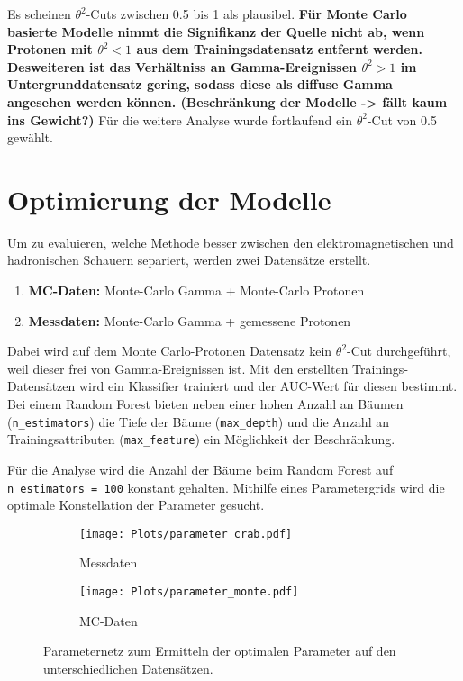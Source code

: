 Es scheinen $\theta^{2}$-Cuts zwischen \num{0.5} bis \num{1} als plausibel. 
\textbf{Für Monte Carlo basierte Modelle nimmt die Signifikanz der Quelle nicht ab, wenn Protonen mit $\theta^{2} < 1$ aus dem Trainingsdatensatz entfernt werden. 
Desweiteren ist das Verhältniss an Gamma-Ereignissen $\theta^{2} > 1$ im Untergrunddatensatz gering, sodass diese als diffuse Gamma angesehen werden können. (Beschränkung der Modelle -> fällt kaum ins Gewicht?)} 
Für die weitere Analyse wurde fortlaufend ein $\theta^{2}$-Cut von \num{0.5} gewählt. 
\section{Optimierung der Modelle}
Um zu evaluieren, welche Methode besser zwischen den elektromagnetischen und hadronischen Schauern separiert, werden zwei Datensätze erstellt. 
\begin{enumerate}
  \item \textbf{MC-Daten:} Monte-Carlo Gamma + Monte-Carlo Protonen
  \item \textbf{Messdaten:} Monte-Carlo Gamma + gemessene Protonen 
\end{enumerate}
Dabei wird auf dem Monte Carlo-Protonen Datensatz kein $\theta^{2}$-Cut durchgeführt, weil dieser frei von Gamma-Ereignissen ist.
Mit den erstellten Trainings-Datensätzen wird ein Klassifier trainiert und der AUC-Wert für diesen bestimmt.
Bei einem Random Forest bieten neben einer hohen Anzahl an Bäumen (\texttt{n\_estimators}) die Tiefe der Bäume (\texttt{max\_depth}) und die Anzahl an Trainingsattributen (\texttt{max\_feature}) ein Möglichkeit der Beschränkung.

Für die Analyse wird die Anzahl der Bäume beim Random Forest auf \texttt{n\_estimators = 100} konstant gehalten. 
Mithilfe eines Parametergrids wird die optimale Konstellation der Parameter gesucht. 
\begin{figure}
  \begin{subfigure}[b]{0.5\textwidth}
	\texttt{[image: Plots/parameter\_crab.pdf]}
	\caption{Messdaten}
	\label{fig:messGrid}
  \end{subfigure}
  \begin{subfigure}[b]{0.5\textwidth}
	\texttt{[image: Plots/parameter\_monte.pdf]}
	\caption{MC-Daten}
	\label{fig:mcGrid}
  \end{subfigure}
  \caption{Parameternetz zum Ermitteln der optimalen Parameter auf den unterschiedlichen Datensätzen.}
\end{figure}

